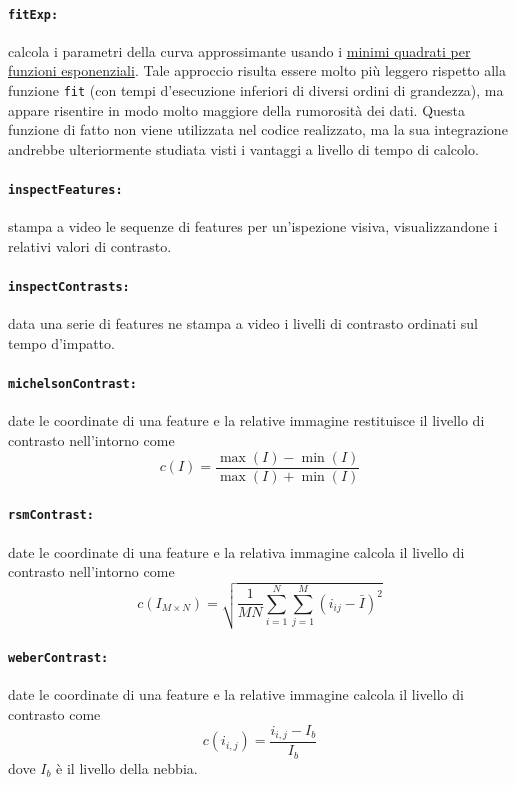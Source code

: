 \documentclass[12pt]{report}
\begin{document}
\paragraph*{\verb_fitExp:_} calcola i parametri della curva approssimante usando i \href{http://mathworld.wolfram.com/LeastSquaresFittingExponential.html}{minimi quadrati per funzioni esponenziali}. Tale approccio risulta essere molto pi\`u leggero rispetto alla funzione \verb|fit| (con tempi d'esecuzione inferiori di diversi ordini di grandezza), ma appare risentire in modo molto maggiore della rumorosit\`a dei dati. Questa funzione di fatto non viene utilizzata nel codice realizzato, ma la sua integrazione andrebbe ulteriormente studiata visti i vantaggi a livello di tempo di calcolo.
\label{subsect:fitExp}

\paragraph*{\verb_inspectFeatures:_} stampa a video le sequenze di features per un'ispezione visiva, visualizzandone i relativi valori di contrasto.

\paragraph*{\verb_inspectContrasts:_} data una serie di features ne stampa a video i livelli di contrasto ordinati sul tempo d'impatto.

\paragraph*{\verb_michelsonContrast:_} date le coordinate di una feature e la relative immagine restituisce il livello di contrasto nell'intorno come $$c\left(I\right) = \frac{\max(I)-\min(I)}{\max(I)+\min(I)}$$

\paragraph*{\verb_rsmContrast:_} date le coordinate di una feature e la relativa immagine calcola il livello di contrasto nell'intorno come $$ c\left(I_{M\times N}\right) = \sqrt{\frac{1}{MN}\sum_{i=1}^N\sum_{j=1}^M(i_{ij}-\bar{I})^2} $$

\paragraph*{\verb_weberContrast:_} date le coordinate di una feature e la relative immagine calcola il livello di contrasto come $$c\left(i_{i,j}\right)= \frac{i_{i,j}-I_b}{I_b}$$ dove $I_b$ \`e il livello della nebbia.
\end{document}
